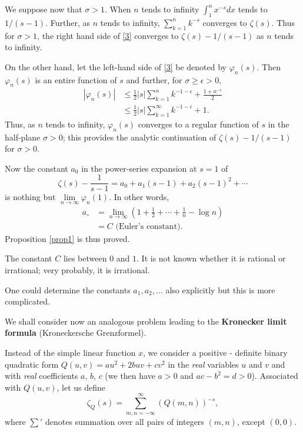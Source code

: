 We suppose now that $\sigma>1$. When $n$ tends to infinity
$\int^{n}_{1}x^{-s}dx$ tends to $1/(s-1)$. Further, as $n$ tends to
infinity, $\sum\limits^{n}_{k=1}k^{-s}$ converges to $\zeta(s)$. Thus
for $\sigma>1$, the right hand side of \eqref{3} converges to
$\zeta(s)-1/(s-1)$ as $n$ tends to infinity.

On the other hand, let the left-hand side of \eqref{3} be denoted by
$\varphi_{n}(s)$. Then $\varphi_{n}(s)$ is an entire function of $s$
and further, for $\sigma\geq\epsilon>0$,
\begin{align*}
|\varphi_{n}(s)| &\leq
\frac{1}{2}|s|\sum^{n}_{k=1}k^{-1-\epsilon}+\frac{1+n^{-\epsilon}}{2}\\
&\leq \frac{1}{2}|s|\sum^{\infty}_{k=1}k^{-1-\epsilon}+1.
\end{align*}
Thus, as $n$ tends to infinity, $\varphi_{n}(s)$ converges to a
regular function of $s$ in the half-plane $\sigma>0$; this provides
the analytic continuation of $\zeta(s)-1/(s-1)$ for $\sigma>0$.

Now the constant $a_{0}$ in the power-series expansion at $s=1$ of 
$$
\zeta(s)-\frac{1}{s-1}=a_{0}+a_{1}(s-1)+a_{2}(s-1)^{2}+\cdots
$$
is nothing but $\lim\limits_{n\to \infty}\varphi_{n}(1)$. In other
words, 
\begin{align*}
a_{\circ}  & = 
\lim\limits_{n\to\infty}\left(1+\frac{1}{2}+\cdots+\frac{1}{n}-\log
n\right)\\
&= C\text{ (Euler's constant).}
\end{align*}\pageoriginale
Proposition \ref{prop1} is thus proved.

The constant $C$ lies between $0$ and $1$. It is not known whether it
is rational or irrational; very probably, it is irrational.

One could determine the constants $a_{1},a_{2},\ldots$ also explicitly
but this is more complicated.

We shall consider now an analogous problem leading to the {\bf
  Kronecker limit formula} (Kroneckersche Grenzformel).

Instead of the simple linear function $x$, we consider a
positive - definite binary quadratic form $Q(u,v)=au^{2}+2buv+cv^{2}$ in
the {\em real} variables $u$ and $v$ and with {\em real} coefficients
$a$, $b$, $c$ (we then have $a>0$ and $ac-b^{2}=d>0$). Associated with
$Q(u,v)$, let us define
\begin{equation*}
\zeta_{Q}(s)=\sum^{\infty}_{m,n=-\infty}(Q(m,n))^{-s},\tag{4}\label{4}
\end{equation*}
where $\sum'$ denotes summation over all pairs of integers $(m,n)$,
except $(0,0)$.

